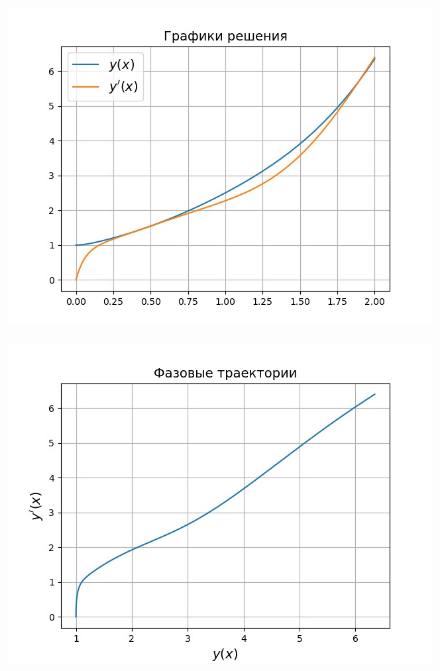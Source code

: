 \documentclass{report}
\begin{document}
\begin{figure}[h]
    \centering
    \includegraphics[width=14cm]{reshenie.jpg}
\end{figure}

\begin{figure}[h]
    \centering
    \includegraphics[width=14cm]{faz.jpg}
\end{figure}
\end{document}
